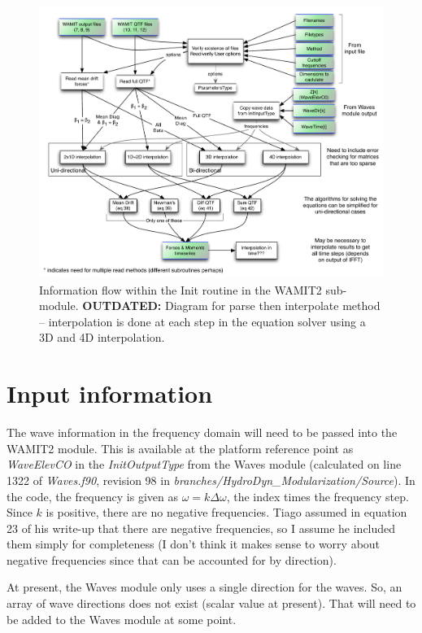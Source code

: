 \begin{figure}
   \centering
      \includegraphics[width=.9\textwidth]{chaps/figures/HydroDyn_2nd_order--WAMIT2_Init.pdf}
      \caption{Information flow within the Init routine in the WAMIT2 sub-module. {\bfseries OUTDATED:} Diagram for parse then interpolate method -- interpolation is done at each step in the equation solver using a 3D and 4D interpolation.\label{fig:InitInformationFlow}}
\end{figure}

\section{Input information}
The wave information in the frequency domain will need to be passed into the WAMIT2 module. This is available at the platform reference point as \emph{WaveElevCO} in the \emph{InitOutputType} from the Waves module (calculated on line 1322 of \emph{Waves.f90}, revision 98 in \emph{branches/HydroDyn\_Modularization/Source}). In the code, the frequency is given as $\omega = k \Delta \omega$, the index times the frequency step. Since $k$ is positive, there are no negative frequencies. Tiago assumed in equation 23 of his write-up that there are negative frequencies, so I assume he included them simply for completeness (I don't think it makes sense to worry about negative frequencies since that can be accounted for by direction).

At present, the Waves module only uses a single direction for the waves. So, an array of wave directions does not exist (scalar value at present). That will need to be added to the Waves module at some point.

